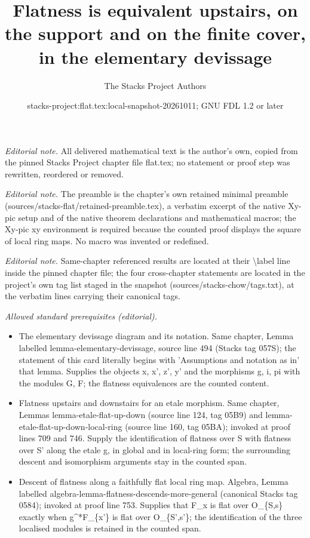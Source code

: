 \documentclass[10pt,a4paper]{amsart}
\title{Flatness is equivalent upstairs, on the support and on the finite cover, in the elementary devissage}
\author{The Stacks Project Authors}
\date{stacks-project:flat.tex:local-snapshot-20261011; GNU FDL 1.2 or later}
\theoremstyle{plain}
\theoremstyle{definition}
\theoremstyle{remark}
\numberwithin{equation}{subsection}
\begin{document}
\maketitle
\noindent\textit{Editorial note.} All delivered mathematical text is the author's own, copied from the pinned Stacks Project chapter file flat.tex; no statement or proof step was rewritten, reordered or removed.\par\medskip
\noindent\textit{Editorial note.} The preamble is the chapter's own retained minimal preamble (sources/stacks-flat/retained-preamble.tex), a verbatim excerpt of the native Xy-pic setup and of the native theorem declarations and mathematical macros; the Xy-pic xy environment is required because the counted proof displays the square of local ring maps. No macro was invented or redefined.\par\medskip
\noindent\textit{Editorial note.} Same-chapter referenced results are located at their \textbackslash{}label line inside the pinned chapter file; the four cross-chapter statements are located in the project's own tag list staged in the snapshot (sources/stacks-chow/tags.txt), at the verbatim lines carrying their canonical tags.\par\medskip
\noindent\textit{Allowed standard prerequisites (editorial).}\begin{itemize}
\item The elementary devissage diagram and its notation. Same chapter, Lemma labelled lemma-elementary-devissage, source line 494 (Stacks tag 057S); the statement of this card literally begins with 'Assumptions and notation as in' that lemma. Supplies the objects x, x', z', y' and the morphisms g, i, pi with the modules G, F; the flatness equivalences are the counted content.
\item Flatness upstairs and downstairs for an etale morphism. Same chapter, Lemmas lemma-etale-flat-up-down (source line 124, tag 05B9) and lemma-etale-flat-up-down-local-ring (source line 160, tag 05BA); invoked at proof lines 709 and 746. Supply the identification of flatness over S with flatness over S' along the etale g, in global and in local-ring form; the surrounding descent and isomorphism arguments stay in the counted span.
\item Descent of flatness along a faithfully flat local ring map. Algebra, Lemma labelled algebra-lemma-flatness-descends-more-general (canonical Stacks tag 0584); invoked at proof line 753. Supplies that F\_x is flat over O\_\{S,s\} exactly when g\textasciicircum{}*F\_\{x'\} is flat over O\_\{S',s'\}; the identification of the three localised modules is retained in the counted span.
\end{itemize}\medskip
\end{document}
